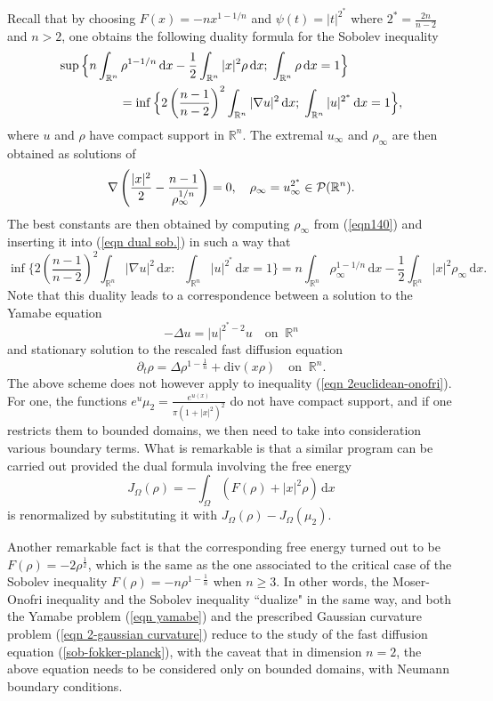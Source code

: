 \documentclass[10pt]{article}
\numberwithin{equation}{section}
\theoremstyle{plain}
\theoremstyle{definition}
\theoremstyle{remark}
\newcommand\R{{\mathbb R}}
\newcommand\dd{\,\mbox{d} }
\def\div{\mbox{div} }
\begin{document}
Recall that by choosing $F(x)=-nx^{1-1/n}$ and $\psi(t)=|t|^{2^*}$ where $2^*=\frac{2n}{n-2}$ and $n>2$, one obtains 
the following duality formula for the Sobolev inequality 
\begin{eqnarray}\label{eqn dual sob.}
\lefteqn{\sup\Big\{n\int_{\R^n}\rho^{1-1/n}\dd x - \frac{1}{2}\int_{\R^n} |x|^2\rho \dd x;  \;\int_{\R^n} \rho \dd x=1\Big\} }\nonumber\\
& & \qquad \qquad = \inf\Big\{2\left(\frac{n-1}{n-2}\right)^2 \int_{\R^n} |\nabla u|^2\dd x; \;\int_{\R^n} |u|^{2^*}\dd x =1\Big\},
\end{eqnarray}
where $u$ and $\rho$ have compact support in $\R^n$. The extremal $u_\infty$ and $\rho_\infty$ are then obtained as solutions of 
\begin{equation}\label{eqn140}
\nabla\left(\frac{|x|^{2}}{2} - \frac{n-1}{\rho_\infty^{1/n}}\right)=0, \quad \rho_\infty=u_\infty^{2^*}\in {\cal P}(\R^n).
\end{equation}
The best constants are then obtained 
by computing $\rho_\infty$ from (\ref{eqn140}) and inserting it into (\ref{eqn dual sob.}) in such a way that 
\[\inf\Big\{2\left(\frac{n-1}{n-2}\right)^2 \int_{\R^n} |\nabla u|^2\dd x: \;\; \int_{\R^n} |u|^{2^*}\dd x =1\Big\} = 
n\int_{\R^n}\rho_\infty^{1-1/n}\dd x - \frac{1}{2}\int_{\R^n} |x|^2\rho_\infty \dd x.\]
Note that this duality leads to a correspondence between a solution to the Yamabe equation 
\begin{equation}\label{eqn yamabe}
-\Delta u = |u|^{2^*-2}u \quad \mbox{on}\;\; \R^n
\end{equation}
and stationary solution to the rescaled fast diffusion  equation 
\begin{equation}\label{sob-fokker-planck}
\partial_t \rho = \Delta\rho^{1-\frac{1}{n}} + \div(x\rho) \quad \mbox{on}\;\; \R^n.
\end{equation}
The above scheme does not however apply to inequality (\ref{eqn 2euclidean-onofri}). For one, the functions $e^u\mu_2=\frac{e^{u(x)}}{\pi(1+|x|^2)^2}$ do not have compact support, and if one restricts them to bounded domains, we then need to take into consideration various boundary terms. What is remarkable is that a similar program can be carried out provided the dual formula involving the free energy  
$$J_\Omega (\rho)=- \int_{\Omega}(F(\rho) + |x|^2\rho) \dd x
$$ is renormalized by substituting it with 
$J_\Omega (\rho)-J_\Omega (\mu_2)$. 

Another remarkable fact is that the corresponding free energy turned out to be $F(\rho)=-2\rho^{\frac{1}{2}}$, which is the same as the one associated to the critical case of the Sobolev inequality $F(\rho)=-n\rho^{1-\frac{1}{n}}$ when $n\geq 3$. In other words, the Moser-Onofri inequality and the Sobolev inequality ``dualize" in the same way, and both the Yamabe problem (\ref{eqn yamabe}) and the prescribed Gaussian curvature problem (\ref{eqn 2-gaussian curvature}) reduce to the study of the fast diffusion equation (\ref{sob-fokker-planck}), 
with the caveat that in dimension $n=2$, the above equation needs to be considered only on bounded domains, with Neumann boundary conditions.  
\end{document}
